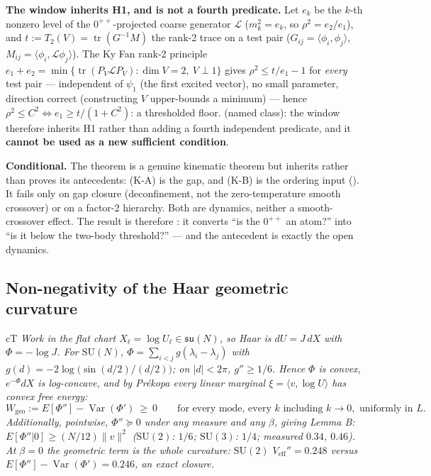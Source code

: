 \textbf{The window inherits H1, and is not a fourth predicate.} Let $e_k$ be the $k$-th
nonzero level of the $0^{++}$-projected coarse generator $\mathcal L$ ($m_k^2=e_k$, so
$\rho^2=e_2/e_1$), and $t:=T_2(V)=\operatorname{tr}(G^{-1}M)$ the rank-2 trace on a test pair
($G_{ij}=\langle\phi_i,\phi_j\rangle$, $M_{ij}=\langle\phi_i,\mathcal L\phi_j\rangle$). The Ky Fan
rank-2 principle $e_1+e_2=\min\{\operatorname{tr}(P_V\mathcal L P_V):\dim V=2,\ V\perp1\}$ gives
$\rho^2\le t/e_1-1$ for \emph{every} test pair --- independent of $\psi_1$ (the first excited
vector), no small parameter, direction correct (constructing $V$ upper-bounds a minimum) --- hence
$\rho^2\le C^2\iff e_1\ge t/(1+C^2)$: a thresholded floor. \LN{} (named class): the window therefore
inherits H1 rather than adding a fourth independent predicate, and it \textbf{cannot be used as a new
sufficient condition}.

\textbf{Conditional.} The theorem is a genuine kinematic theorem but inherits rather than proves
its antecedents: (K-A) is the gap, and (K-B) is the ordering input (). It fails only
on gap closure (deconfinement, not the zero-temperature smooth crossover) or on a factor-2
hierarchy. Both are dynamics, neither a smooth-crossover effect. The result is therefore \LC: it
converts ``is the $0^{++}$ an atom?'' into ``is it below the two-body threshold?'' --- and the
antecedent is exactly the open dynamics.

\subsection{Non-negativity of the Haar geometric curvature}
\label{sec:wgeo}


\begin{claimbox}{cT}
 \emph{Work in the flat chart
$X_\ell=\log U_\ell\in\mathfrak{su}(N)$, so Haar is $dU=J\,dX$ with $\Phi=-\log J$. For
$\mathrm{SU}(N)$, $\Phi=\sum_{i<j}g(\lambda_i-\lambda_j)$ with
$g(d)=-2\log\bigl(\sin(d/2)/(d/2)\bigr)$; on $|d|<2\pi$, $g''\ge1/6$. Hence $\Phi$ is convex,
$e^{-\Phi}dX$ is log-concave, and by Pr\'ekopa every linear marginal $\xi=\langle v,\log U\rangle$
has convex free energy:}
\begin{equation}
W_{\mathrm{geo}}:=E[\Phi'']-\operatorname{Var}(\Phi')\ \ge\ 0
\qquad\text{for every mode, every } k \text{ including } k\to0,\text{ uniformly in } L.
\label{eq:wgeo}
\end{equation}
\emph{Additionally, pointwise, $\Phi''\succeq0$ under any measure and any $\beta$, giving
Lemma B: $E[\Phi''|0]\ge(N/12)\|v\|^2$ ($\mathrm{SU}(2)$: $1/6$; $\mathrm{SU}(3)$: $1/4$;
measured $0.34$, $0.46$). At $\beta=0$ the geometric term is the whole curvature: $\mathrm{SU}(2)$
$V_{\mathrm{eff}}''=0.248$ versus $E[\Phi'']-\operatorname{Var}(\Phi')=0.246$, an exact
closure.}
\end{claimbox}

